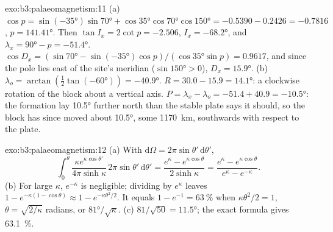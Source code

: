 \begin{solution}{exo:b3:palaeomagnetism:11}
(a) $\cos p = \sin(\ang{-35})\sin\ang{70} + \cos\ang{35}\cos\ang{70}\cos\ang{150}
= -0.5390 - 0.2426 = -0.7816$, $p = \ang{141.41}$. Then $\tan I_x = 2\cot p =
-2.506$, $I_x = \ang{-68.2}$, and $\lambda_x = \ang{90} - p = \ang{-51.4}$.
$\cos D_x = (\sin\ang{70} - \sin(\ang{-35})\cos p)/(\cos\ang{35}\sin p) =
0.9617$, and since the pole lies east of the site's meridian ($\sin\ang{150} >
0$), $D_x = \ang{15.9}$. (b) $\lambda_o = \arctan(\tfrac12\tan(\ang{-60})) =
\ang{-40.9}$. $R = 30.0 - 15.9 = \ang{14.1}$: a clockwise rotation of the block
about a vertical axis. $P = \lambda_x - \lambda_o = -51.4 + 40.9 =
\ang{-10.5}$: the formation lay \ang{10.5} further north than the stable plate
says it should, so the block has since moved about \ang{10.5}, some
\qty{1170}{km}, southwards with respect to the plate.
\end{solution}

\begin{solution}{exo:b3:palaeomagnetism:12}
(a) With $\mathrm d\Omega = 2\pi\sin\theta'\,\mathrm d\theta'$,
\[
  \int_0^\theta\frac{\kappa e^{\kappa\cos\theta'}}{4\pi\sinh\kappa}\,2\pi\sin\theta'\,
  \mathrm d\theta' = \frac{e^\kappa - e^{\kappa\cos\theta}}{2\sinh\kappa}
  = \frac{e^\kappa - e^{\kappa\cos\theta}}{e^\kappa - e^{-\kappa}} .
\]
(b) For large $\kappa$, $e^{-\kappa}$ is negligible; dividing by $e^\kappa$
leaves $1 - e^{-\kappa(1 - \cos\theta)} \approx 1 - e^{-\kappa\theta^2/2}$. It
equals $1 - e^{-1} = \qty{63}{\percent}$ when $\kappa\theta^2/2 = 1$, $\theta =
\sqrt{2/\kappa}$ radians, or $\ang{81}/\sqrt\kappa$. (c) $81/\sqrt{50} =
\ang{11.5}$; the exact formula gives \qty{63.1}{\percent}.
\end{solution}

